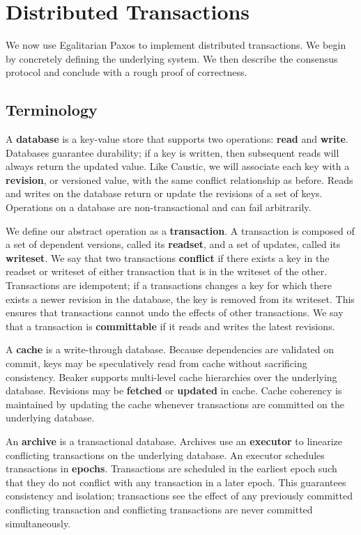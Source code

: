 \documentclass[../main.tex]{subfiles}
\begin{document}
\section{Distributed Transactions}
We now use Egalitarian Paxos to implement distributed transactions. We begin by concretely
defining the underlying system. We then describe the consensus protocol and conclude with a rough
proof of correctness.

  \subsection{Terminology}
  A \textbf{database} is a key-value store that supports two operations: \textbf{read} and
  \textbf{write}. Databases guarantee durability; if a key is written, then subsequent reads will
  always return the updated value. Like Caustic, we will associate each key with a
  \textbf{revision}, or versioned value, with the same conflict relationship as before. Reads and
  writes on the database return or update the revisions of a set of keys. Operations on a database
  are non-transactional and can fail arbitrarily.

  We define our abstract operation as a \textbf{transaction}. A transaction is composed of a set
  of dependent versions, called its \textbf{readset}, and a set of updates, called its
  \textbf{writeset}. We say that two transactions \textbf{conflict} if there exists a key in the
  readset or writeset of either transaction that is in the writeset of the other. Transactions are
  idempotent; if a transactions changes a key for which there exists a newer revision in the
  database, the key is removed from its writeset. This ensures that transactions cannot undo the
  effects of other transactions. We say that a transaction is \textbf{committable} if it reads and
  writes the latest revisions.

  A \textbf{cache} is a write-through database. Because dependencies are validated on commit, keys
  may be speculatively read from cache without sacrificing consistency. Beaker supports multi-level
  cache hierarchies over the underlying database. Revisions may be \textbf{fetched} or
  \textbf{updated} in cache. Cache coherency is maintained by updating the cache whenever
  transactions are committed on the underlying database.

  An \textbf{archive} is a transactional database. Archives use an \textbf{executor} to linearize
  conflicting transactions on the underlying database. An executor schedules transactions in
  \textbf{epochs}. Transactions are scheduled in the earliest epoch such that they do not conflict
  with any transaction in a later epoch. This guarantees consistency and isolation; transactions
  see the effect of any previously committed conflicting transaction and conflicting transactions
  are never committed simultaneously.
\end{document}

